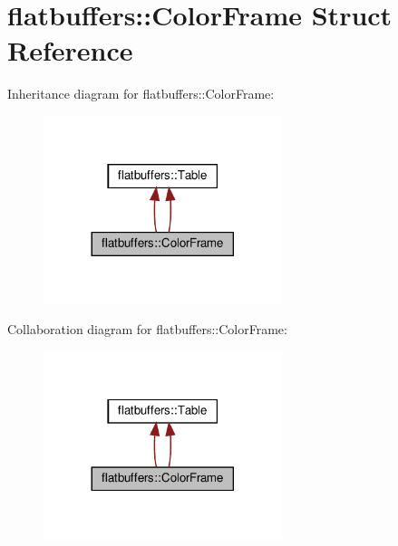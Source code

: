 \hypertarget{structflatbuffers_1_1ColorFrame}{}\section{flatbuffers\+:\+:Color\+Frame Struct Reference}
\label{structflatbuffers_1_1ColorFrame}


Inheritance diagram for flatbuffers\+:\+:Color\+Frame\+:
\nopagebreak
\begin{figure}[H]
\begin{center}
\leavevmode
\includegraphics[width=197pt]{structflatbuffers_1_1ColorFrame__inherit__graph}
\end{center}
\end{figure}


Collaboration diagram for flatbuffers\+:\+:Color\+Frame\+:
\nopagebreak
\begin{figure}[H]
\begin{center}
\leavevmode
\includegraphics[width=197pt]{structflatbuffers_1_1ColorFrame__coll__graph}
\end{center}
\end{figure}
